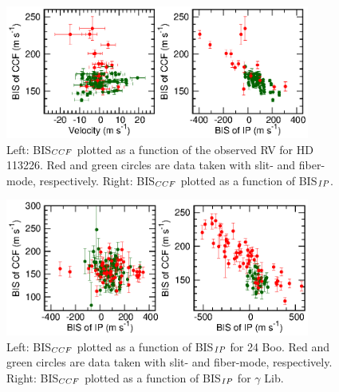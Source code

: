 \documentclass[]{pasj01}
\begin{document}
\begin{figure}
\begin{center}
\includegraphics[width=10cm]{rv_bis_ip_113226.eps}
\end{center}
\caption{Left: BIS$_{\rm CCF}$ plotted as a function of the observed RV for HD 113226. Red and green circles are data taken with slit- and fiber-mode, respectively. Right: BIS$_{\rm CCF}$ plotted as a function of BIS$_{\rm IP}$.}
\label{rv_bis_ip_113226}
\end{figure}

\begin{figure}
\begin{center}
\includegraphics[width=10cm]{rv_bis_ip_127_138.eps}
\end{center}
\caption{Left: BIS$_{\rm CCF}$ plotted as a function of BIS$_{\rm IP}$ for 24 Boo. Red and green circles are data taken with slit- and fiber-mode, respectively. Right: BIS$_{\rm CCF}$ plotted as a function of BIS$_{\rm IP}$ for $\gamma$ Lib.}
\label{rv_bis_ip_127_138}
\end{figure}


\end{document}
